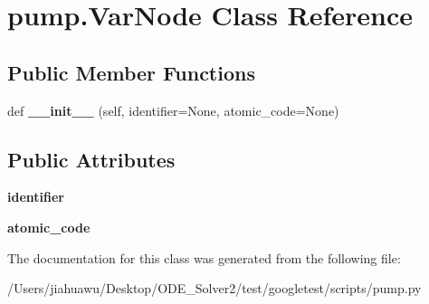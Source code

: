 \hypertarget{classpump_1_1_var_node}{}\section{pump.\+Var\+Node Class Reference}
\label{classpump_1_1_var_node}
\subsection*{Public Member Functions}
\begin{DoxyCompactItemize}
\item 
\mbox{\label{classpump_1_1_var_node_adf79bf21b1db5367792a4ac91f94a756}} 
def {\bfseries \+\_\+\+\_\+init\+\_\+\+\_\+} (self, identifier=None, atomic\+\_\+code=None)
\end{DoxyCompactItemize}
\subsection*{Public Attributes}
\begin{DoxyCompactItemize}
\item 
\mbox{\label{classpump_1_1_var_node_aa2b634e2443646c3754f2d193efa4dc7}} 
{\bfseries identifier}
\item 
\mbox{\label{classpump_1_1_var_node_ad6bef6a8577b994fbe9ccddf3c82d2fc}} 
{\bfseries atomic\+\_\+code}
\end{DoxyCompactItemize}


The documentation for this class was generated from the following file\+:\begin{DoxyCompactItemize}
\item 
/\+Users/jiahuawu/\+Desktop/\+O\+D\+E\+\_\+\+Solver2/test/googletest/scripts/pump.\+py\end{DoxyCompactItemize}
